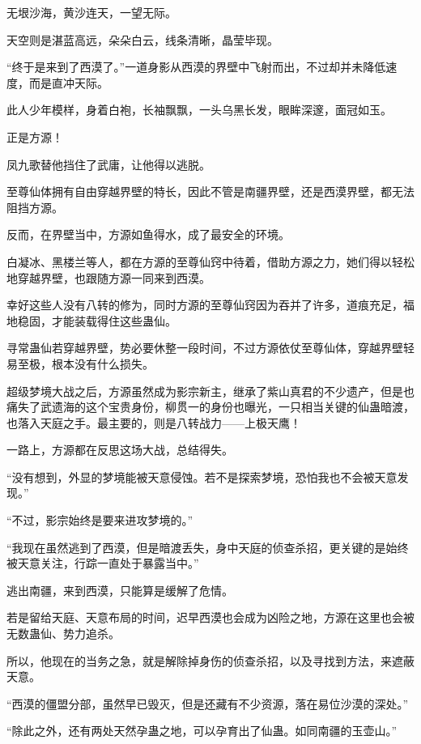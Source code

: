 
\begin{this_body}



无垠沙海，黄沙连天，一望无际。

天空则是湛蓝高远，朵朵白云，线条清晰，晶莹毕现。

“终于是来到了西漠了。”一道身影从西漠的界壁中飞射而出，不过却并未降低速度，而是直冲天际。

此人少年模样，身着白袍，长袖飘飘，一头乌黑长发，眼眸深邃，面冠如玉。

正是方源！

凤九歌替他挡住了武庸，让他得以逃脱。

至尊仙体拥有自由穿越界壁的特长，因此不管是南疆界壁，还是西漠界壁，都无法阻挡方源。

反而，在界壁当中，方源如鱼得水，成了最安全的环境。

白凝冰、黑楼兰等人，都在方源的至尊仙窍中待着，借助方源之力，她们得以轻松地穿越界壁，也跟随方源一同来到西漠。

幸好这些人没有八转的修为，同时方源的至尊仙窍因为吞并了许多，道痕充足，福地稳固，才能装载得住这些蛊仙。

寻常蛊仙若穿越界壁，势必要休整一段时间，不过方源依仗至尊仙体，穿越界壁轻易至极，根本没有什么损失。

超级梦境大战之后，方源虽然成为影宗新主，继承了紫山真君的不少遗产，但是也痛失了武遗海的这个宝贵身份，柳贯一的身份也曝光，一只相当关键的仙蛊暗渡，也落入天庭之手。最主要的，则是八转战力——上极天鹰！

一路上，方源都在反思这场大战，总结得失。

“没有想到，外显的梦境能被天意侵蚀。若不是探索梦境，恐怕我也不会被天意发现。”

“不过，影宗始终是要来进攻梦境的。”

“我现在虽然逃到了西漠，但是暗渡丢失，身中天庭的侦查杀招，更关键的是始终被天意关注，行踪一直处于暴露当中。”

逃出南疆，来到西漠，只能算是缓解了危情。

若是留给天庭、天意布局的时间，迟早西漠也会成为凶险之地，方源在这里也会被无数蛊仙、势力追杀。

所以，他现在的当务之急，就是解除掉身伤的侦查杀招，以及寻找到方法，来遮蔽天意。

“西漠的僵盟分部，虽然早已毁灭，但是还藏有不少资源，落在易位沙漠的深处。”

“除此之外，还有两处天然孕蛊之地，可以孕育出了仙蛊。如同南疆的玉壶山。”


\end{this_body}
